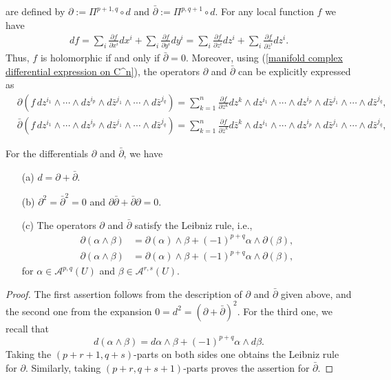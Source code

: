 are defined by $\partial:=\Pi^{p+1,q}\circ d$ and $\bar{\partial}:=\Pi^{p,q+1}\circ d$. For any local function $f$ we have
\begin{align}\label{manifold complex differential expression on C^n}
df=\sum_i\frac{\partial f}{\partial x^i}dx^i+\sum_i\frac{\partial f}{\partial y^i}dy^i=\sum_i\frac{\partial f}{\partial z^i}dz^i+\sum_i\frac{\partial f}{\partial\bar{z}^i}dz^i.
\end{align}
Thus, $f$ is holomorphic if and only if $\bar{\partial}=0$. Moreover, using (\ref{manifold complex differential expression on C^n}), the operators $\partial$ and $\bar{\partial}$ can be explicitly expressed as
\begin{align*}
&\partial(f\,dz^{i_1}\wedge\cdots\wedge dz^{i_p}\wedge d\bar{z}^{j_1}\wedge\cdots\wedge d\bar{z}^{j_q})=\sum_{k=1}^{n}\frac{\partial f}{\partial z^k}dz^k\wedge dz^{i_1}\wedge\cdots\wedge dz^{i_p}\wedge d\bar{z}^{j_1}\wedge\cdots\wedge d\bar{z}^{j_q},\\
&\bar{\partial}(f\,dz^{i_1}\wedge\cdots\wedge dz^{i_p}\wedge d\bar{z}^{j_1}\wedge\cdots\wedge d\bar{z}^{j_q})=\sum_{k=1}^{n}\frac{\partial f}{\partial \bar{z}^k}d\bar{z}^k\wedge dz^{i_1}\wedge\cdots\wedge dz^{i_p}\wedge d\bar{z}^{j_1}\wedge\cdots\wedge d\bar{z}^{j_q},
\end{align*}
\begin{proposition}\label{complex manifold partial bar-partial on C^n prop}
For the differentials $\partial$ and $\bar{\partial}$, we have
\begin{itemize}
\item[(a)] $d=\partial+\bar{\partial}$.
\item[(b)] $\partial^2=\bar{\partial}^2=0$ and $\partial\bar{\partial}+\bar{\partial}\partial=0$.
\item[(c)] The operators $\partial$ and $\bar{\partial}$ satisfy the Leibniz rule, i.e.,
\begin{align*}
\partial(\alpha\wedge\beta)&=\partial(\alpha)\wedge\beta+(-1)^{p+q}\alpha\wedge\partial(\beta),\\
\partial(\alpha\wedge\beta)&=\partial(\alpha)\wedge\beta+(-1)^{p+q}\alpha\wedge\partial(\beta),
\end{align*} 
for $\alpha\in\mathcal{A}^{p,q}(U)$ and $\beta\in\mathcal{A}^{r,s}(U)$.
\end{itemize}
\end{proposition}
\begin{proof}
The first assertion follows from the description of $\partial$ and $\bar{\partial}$ given above, and the second one from the expansion $0=d^2=(\partial+\bar{\partial})^2$. For the third one, we recall that
\[d(\alpha\wedge\beta)=d\alpha\wedge\beta+(-1)^{p+q}\alpha\wedge d\beta.\]
Taking the $(p+r+1,q+s)$-parts on both sides one obtains the Leibniz rule for $\partial$. Similarly, taking $(p+r,q+s+1)$-parts proves the assertion for $\bar{\partial}$.
\end{proof}
